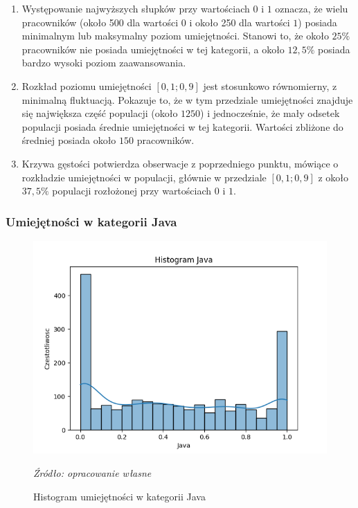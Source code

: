         \begin{enumerate}
            \item Występowanie najwyższych słupków przy wartościach $0$ i $1$ oznacza, że wielu pracowników (około 500 dla wartości $0$ i około 250 dla wartości $1$) posiada minimalnym lub maksymalny poziom umiejętności. Stanowi to, że około $25\%$ pracowników nie posiada umiejętności w tej kategorii, a około $12,5\%$ posiada bardzo wysoki poziom zaawansowania.
            \item Rozkład poziomu umiejętności $[0,1; 0,9]$ jest stosunkowo równomierny, z minimalną fluktuacją. Pokazuje to, że w tym przedziale umiejętności znajduje się największa część populacji (około $1250$) i jednocześnie, że mały odsetek populacji posiada średnie umiejętności w tej kategorii. Wartości zbliżone do średniej posiada około $150$ pracowników.
            \item Krzywa gęstości potwierdza obserwacje z poprzedniego punktu, mówiące o rozkładzie umiejętności w populacji, głównie w przedziale $[0,1; 0,9]$ z około $37,5\%$ populacji rozłożonej przy wartościach $0$ i $1$.
        \end{enumerate}
        
        \subsubsection{Umiejętności w kategorii Java}
        \begin{figure}[H]
            \centering
            \includegraphics[width=\linewidth]{chapters/Images/hist_java.png}
            \cprotect\caption{Histogram umiejętności w kategorii Java}
            \textit{Źródło: opracowanie własne} 
            \label{fig:hist_java}
        \end{figure}

